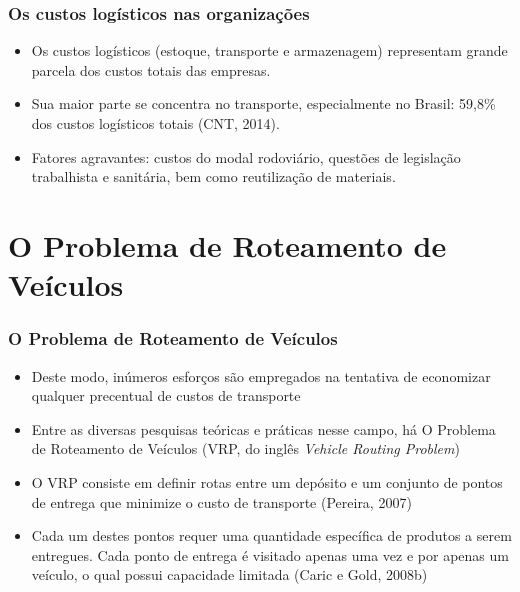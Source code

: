 \documentclass{beamer}
\begin{document}
\begin{frame}
  \frametitle{Os custos logísticos nas organizações}
  \begin{itemize}
   \item Os custos logísticos (estoque, transporte e armazenagem) representam grande parcela dos custos totais das empresas. \newline
   \item Sua maior parte se concentra no transporte, especialmente no Brasil: 59,8\% dos custos logísticos totais (CNT, 2014). \newline
   \item Fatores agravantes: custos do modal rodoviário, questões de legislação trabalhista e sanitária, bem como reutilização de materiais. \newline
  \end{itemize}
   
 
\end{frame}

\section{O Problema de Roteamento de Veículos}
\begin{frame}
 \frametitle{O Problema de Roteamento de Veículos}
 \begin{itemize}
  \item Deste modo, inúmeros esforços são empregados na tentativa de economizar qualquer precentual de custos de transporte    
  \item Entre as diversas pesquisas teóricas e práticas nesse campo, há O Problema de Roteamento de Veículos (VRP, do inglês \textit{Vehicle Routing Problem}) 
  \item O VRP consiste em definir rotas entre um depósito e um conjunto de pontos de entrega que minimize o custo de transporte (Pereira, 2007)
  \item Cada um destes pontos requer uma quantidade específica de produtos a serem entregues. Cada ponto de entrega é visitado apenas uma vez e por apenas um veículo, 
  o qual possui capacidade limitada (Caric e Gold, 2008b)
 \end{itemize}
  
\end{frame}
\end{document}
